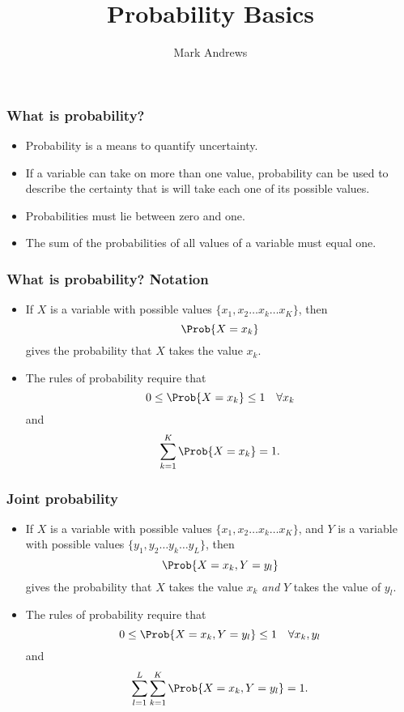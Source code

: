 \documentclass[10pt,xcolor=dvipsnames,serif,professionalfont]{beamer} %
\title[Probability]{Probability Basics}
\author[Andrews]{Mark Andrews}
\date{}
\begin{document}
{
\begin{frame}
   \titlepage
\end{frame}
}
\begin{frame}
\frametitle{What is probability?}
\begin{itemize}
\item Probability is a means to quantify uncertainty.
\item If a variable can take on more than one value, probability can be used to describe the certainty that is will take each one of its possible values.
\item Probabilities must lie between zero and one.
\item The sum of the probabilities of all values of a variable must equal one.
\end{itemize}
\end{frame}

\begin{frame}
\frametitle{What is probability? Notation}
\begin{itemize}
\item If $X$ is a variable with possible values $\{x_1, x_2 \ldots x_k \ldots x_K\}$, then 
\begin{equation}
\Prob{X = x_k} 
\end{equation}
gives the probability that $X$ takes the value $x_k$.
\item The rules of probability require that
\begin{equation}
0 \leq \Prob{X = x_k} \leq 1 \quad \forall x_k 
\end{equation}
and
\begin{equation}
\sum_{k=1}^K \Prob{X = x_k} = 1.
\end{equation}

\end{itemize}
\end{frame}

\begin{frame}
	\frametitle{Joint probability}
\begin{itemize}
\item If $X$ is a variable with possible values $\{x_1, x_2 \ldots x_k \ldots x_K\}$, and $Y$ is a variable with possible values $\{y_1, y_2 \ldots y_k \ldots y_L\}$, then
\begin{equation}
\Prob{X = x_k, Y = y_l} 
\end{equation}
gives the probability that $X$ takes the value $x_k$ \emph{and} $Y$ takes the value of $y_l$.
\item The rules of probability require that
\begin{equation}
0 \leq \Prob{X = x_k, Y = y_l} \leq 1 \quad \forall x_k,y_l 
\end{equation}
and
\begin{equation}
	\sum_{l=1}^L \sum_{k=1}^K \Prob{X = x_k, Y = y_l} = 1.
\end{equation}

\end{itemize}
\end{frame}
\end{document}
